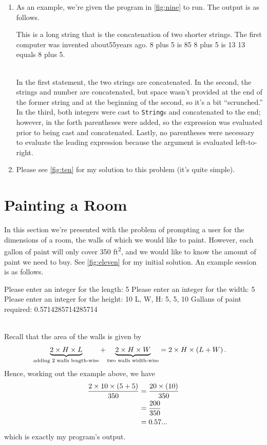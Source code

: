 \documentclass[leqno, 11pt]{article}
\begin{document}
\begin{enumerate}
  \item As an example, we're given the program in \autoref{fig:nine} to run. The output is as follows.
        \begin{verbbox}[\mbox{}\scriptsize]
This is a long string that is the concatenation of two shorter strings.
The first computer was invented about55years ago.
8 plus 5 is 85
8 plus 5 is 13
13 equals 8 plus 5.
        \end{verbbox}
        \begin{figure}[h!]
        \centering
        \theverbbox
        \end{figure}\\
        In the first statement, the two strings are concatenated. In the second, the strings and number are concatenated, but space wasn't provided at the end of the former string and at the beginning of the second, so it's a bit ``scrunched.'' In the third, both integers were cast to \texttt{String}s and concatenated to the end; however, in the forth parentheses were added, so the expression was evaluated prior to being cast and concatenated. Lastly, no parentheses were necessary to evaluate the leading expression because the argument is evaluated left-to-right.
  \item Please see \autoref{fig:ten} for my solution to this problem (it's quite simple).
\end{enumerate}
\section*{Painting a Room}
In this section we're presented with the problem of prompting a user for the dimensions of a room, the walls of which we would like to paint. However, each gallon of paint will only cover 350 \si{ft^{2}}, and we would like to know the amount of paint we need to buy. See \autoref{fig:eleven} for my initial solution. An example session is as follows.
\begin{verbbox}[\mbox{}\scriptsize]
Please enter an integer for the length: 5
Please enter an integer for the width: 5
Please enter an integer for the height: 10
L, W, H: 5, 5, 10
Gallans of paint required: 0.5714285714285714
\end{verbbox}
\begin{figure}[h!]
  \centering
  \theverbbox
\end{figure}\\
Recall that the area of the walls is given by
\begin{align}
  \underbrace{2\times H\times L}_{\text{adding 2 walls length-wise}} + \underbrace{2\times H\times W}_{\text{two walls width-wise}}&=2\times H\times\left(L + W\right).\notag
\end{align}
Hence, working out the example above, we have
\begin{align}
  \dfrac{2\times 10\times \left(5 + 5\right)}{350}&=\dfrac{20\times\left(10\right)}{350}\notag\\&=\dfrac{200}{350}\notag\\&=0.57...\notag
\end{align}
which is exactly my program's output.
\end{document}
